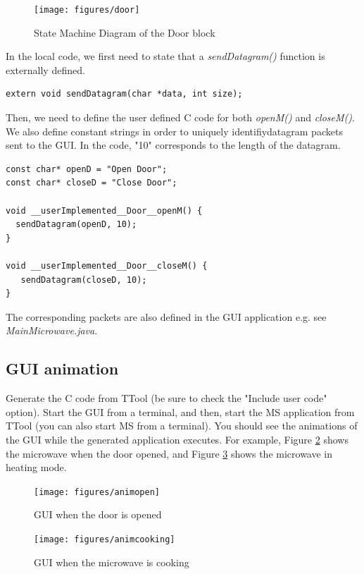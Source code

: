 \documentclass[12pt]{article}
\begin{document}
\begin{figure}[htbp]
\centering
\texttt{[image: figures/door]}
\caption{State Machine Diagram of the Door block} \label{fig:door}
\end{figure}

In the local code, we first need to state that a \textit{sendDatagram()} function is externally defined.
 \begin{lstlisting}
extern void sendDatagram(char *data, int size);
\end{lstlisting}
Then, we need to define the user defined C code for both \textit{openM()} and \textit{closeM()}.  We also define constant strings in order to uniquely identifiydatagram packets sent to the GUI. In the code, "10" corresponds to the length of the datagram. 

\begin{lstlisting}
const char* openD = "Open Door";
const char* closeD = "Close Door";

void __userImplemented__Door__openM() {
  sendDatagram(openD, 10);
}

void __userImplemented__Door__closeM() {
   sendDatagram(closeD, 10);
}
\end{lstlisting}

The corresponding packets are also defined in the GUI application e.g. see \textit{MainMicrowave.java}. 

\subsection{GUI animation}
Generate the C code from TTool (be sure to check the "Include user code" option). Start the GUI from a terminal, and then, start the MS application from TTool (you can also start MS from a terminal). You should see the animations of the GUI while the generated application executes. For example, Figure \ref{fig:animopen} shows the microwave when the door opened, and Figure \ref{fig:animcooking} shows the microwave in heating mode.



\begin{figure}[htbp]
\centering
\texttt{[image: figures/animopen]}
\caption{GUI when the door is opened} \label{fig:animopen}
\end{figure}

\begin{figure}[htbp]
\centering
\texttt{[image: figures/animcooking]}
\caption{GUI when the microwave is cooking} \label{fig:animcooking}
\end{figure}
\end{document}
